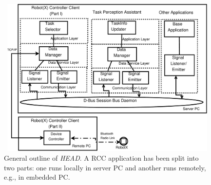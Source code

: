 \documentclass[draft]{ifacconf}
\begin{document}
\begin{figure}
\begin{center}
\includegraphics[width=12cm,height=8cm]{./dia-files/concrete-arch} %
\caption{General outline of {\em HEAD}. A RCC application has been split into two parts: one runs locally in server PC and another runs remotely, e.g., in embedded PC.} 
\label{fig:concrete-arch}
\end{center}
\end{figure}
\end{document}
